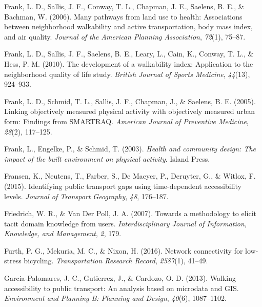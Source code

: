 \documentclass[
11pt, %
oneside, %
english, %
singlespacing, %
]{macthesis} %
\newlength{\cslhangindent}
\newenvironment{CSLReferences}[2] %
 {%
  \setlength{\parindent}{0pt}
  \ifodd #1 \everypar{\setlength{\hangindent}{\cslhangindent}}\ignorespaces\fi
  \ifnum #2 > 0
  \setlength{\parskip}{#2\baselineskip}
  \fi
 }%
 {}
\begin{document}
\begin{CSLReferences}{1}{0}
\leavevmode{}%
Frank, L. D., Sallis, J. F., Conway, T. L., Chapman, J. E., Saelens, B. E., \& Bachman, W. (2006). Many pathways from land use to health: Associations between neighborhood walkability and active transportation, body mass index, and air quality. \emph{Journal of the American Planning Association}, \emph{72}(1), 75--87.

\leavevmode{}%
Frank, L. D., Sallis, J. F., Saelens, B. E., Leary, L., Cain, K., Conway, T. L., \& Hess, P. M. (2010). The development of a walkability index: Application to the neighborhood quality of life study. \emph{British Journal of Sports Medicine}, \emph{44}(13), 924--933.

\leavevmode{}%
Frank, L. D., Schmid, T. L., Sallis, J. F., Chapman, J., \& Saelens, B. E. (2005). Linking objectively measured physical activity with objectively measured urban form: Findings from SMARTRAQ. \emph{American Journal of Preventive Medicine}, \emph{28}(2), 117--125.

\leavevmode{}%
Frank, L., Engelke, P., \& Schmid, T. (2003). \emph{Health and community design: The impact of the built environment on physical activity}. Island Press.

\leavevmode{}%
Fransen, K., Neutens, T., Farber, S., De Maeyer, P., Deruyter, G., \& Witlox, F. (2015). Identifying public transport gaps using time-dependent accessibility levels. \emph{Journal of Transport Geography}, \emph{48}, 176--187.

\leavevmode{}%
Friedrich, W. R., \& Van Der Poll, J. A. (2007). Towards a methodology to elicit tacit domain knowledge from users. \emph{Interdisciplinary Journal of Information, Knowledge, and Management}, \emph{2}, 179.

\leavevmode{}%
Furth, P. G., Mekuria, M. C., \& Nixon, H. (2016). Network connectivity for low-stress bicycling. \emph{Transportation Research Record}, \emph{2587}(1), 41--49.

\leavevmode{}%
Garcia-Palomares, J. C., Gutierrez, J., \& Cardozo, O. D. (2013). Walking accessibility to public transport: An analysis based on microdata and GIS. \emph{Environment and Planning B: Planning and Design}, \emph{40}(6), 1087--1102.


\end{CSLReferences}
\end{document}
